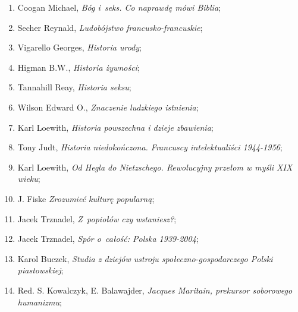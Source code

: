 \documentclass[a4paper,11pt]{article}
\begin{document}
\begin{enumerate}
\item Coogan Michael, \textit{Bóg i~seks. Co naprawdę mówi Biblia};



\item Secher Reynald, \textit{Ludobójstwo francusko-francuskie};



\item Vigarello Georges, \textit{Historia urody};



\item Higman B.W., \textit{Historia żywności};



\item Tannahill Reay, \textit{Historia seksu};



\item Wilson Edward O., \textit{Znaczenie ludzkiego istnienia};



\item Karl Loewith, \textit{Historia powszechna i dzieje zbawienia};



\item Tony Judt, \textit{Historia niedokończona. Francuscy
    intelektualiści 1944-1956};



\item Karl Loewith, \textit{Od Hegla do Nietzschego. Rewolucyjny przełom
    w myśli XIX wieku};



\item J. Fiske \textit{Zrozumieć kulturę popularną};



\item Jacek Trznadel, \textit{Z~popiołów czy wstaniesz?};



\item Jacek Trznadel, \textit{Spór o~całość: Polska 1939-2004};



\item Karol Buczek, \textit{Studia z dziejów ustroju
    społeczno-gospodarczego Polski piastowskiej};



\item Red. S. Kowalczyk, E. Balawajder, \textit{Jacques Maritain,
    prekursor soborowego humanizmu};




\end{enumerate}
\end{document}
